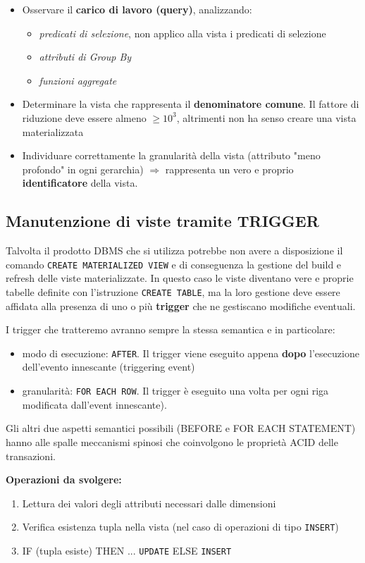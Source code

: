 \documentclass[12pt]{article}
\begin{document}
\begin{itemize}
    \item Osservare il \textbf{carico di lavoro (query)}, analizzando:
    \begin{itemize}
        \item \textsl{predicati di selezione}, non applico alla vista i predicati di selezione
        \item \textsl{attributi di Group By}
        \item \textsl{funzioni aggregate}
    \end{itemize}
    \item Determinare la vista che rappresenta il \textbf{denominatore comune}. Il fattore di riduzione deve essere almeno $\geq 10^3$, altrimenti non ha senso creare una vista materializzata
    \item Individuare correttamente la granularità della vista (attributo "meno profondo" in ogni gerarchia) $\Rightarrow$ rappresenta un vero e proprio \textbf{identificatore} della vista.
\end{itemize}

\subsection{Manutenzione di viste tramite TRIGGER}
Talvolta il prodotto DBMS che si utilizza potrebbe non avere a disposizione il comando \texttt{CREATE MATERIALIZED VIEW} e di conseguenza la gestione del build e refresh delle viste materializzate. In questo caso le viste diventano vere e proprie tabelle definite con l'istruzione \texttt{CREATE TABLE}, ma la loro gestione deve essere affidata alla presenza di uno o più \textbf{trigger} che ne gestiscano modifiche eventuali.

I trigger che tratteremo avranno sempre la stessa semantica e in particolare:
\begin{itemize}
    \item modo di esecuzione: \texttt{AFTER}. Il trigger viene eseguito appena \textbf{dopo} l'esecuzione dell'evento innescante (triggering event)
    \item granularità: \texttt{FOR EACH ROW}. Il trigger è eseguito una volta per ogni riga modificata dall'event innescante).
\end{itemize}
Gli altri due aspetti semantici possibili (BEFORE e FOR EACH STATEMENT) hanno alle spalle meccanismi spinosi che coinvolgono le proprietà ACID delle transazioni.


\textbf{Operazioni da svolgere: }
\begin{enumerate}
    \item Lettura dei valori degli attributi necessari dalle dimensioni
    \item Verifica esistenza tupla nella vista (nel caso di operazioni di tipo \texttt{INSERT})
    \item IF (tupla esiste) THEN ... \texttt{UPDATE} ELSE   \texttt{INSERT} 
\end{enumerate}
\end{document}
